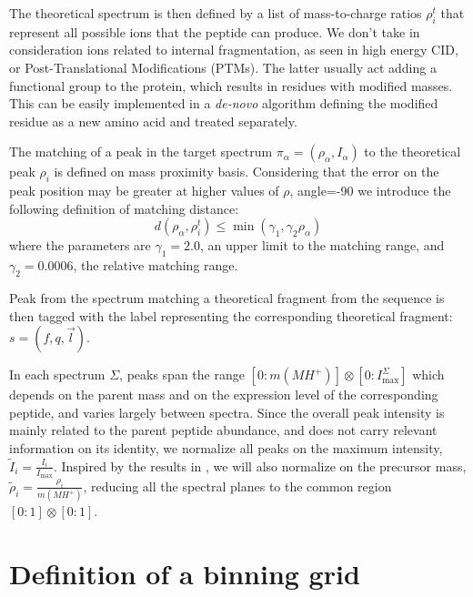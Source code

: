 The theoretical spectrum is then defined by a list of mass-to-charge ratios
$\rho_i^t$ that represent all possible ions that the peptide can produce.
We don't take in consideration ions related to internal fragmentation, as seen in
high energy CID, or Post-Translational Modifications (PTMs). The
latter usually act adding a functional group to the protein, which results in
residues with modified masses. This can be easily implemented in a
\emph{de-novo} algorithm defining the modified residue as a new amino acid and
treated separately.

The matching of a peak in the target spectrum
$\pi_\alpha=(\rho_\alpha,I_\alpha)$ to the theoretical peak $\rho_i$ is
defined on mass proximity basis.
Considering that the error on the peak position may be greater at higher values
of $\rho$, angle=-90
we introduce the following definition of matching distance:
\begin{equation}
d(\rho_\alpha,\rho_i^t)\leq \min(\gamma_1,\gamma_2\rho_\alpha)
\end{equation}
where the parameters are $\gamma_1=2.0$, an upper limit to the matching range,
and $\gamma_2=0.0006$, the relative matching range.

Peak from the spectrum matching a theoretical fragment from the sequence is then
tagged with 
the label representing the corresponding theoretical fragment:
$s=(f,q,\vec l)$.

In each spectrum $\Sigma$, peaks %
span  the range $[0:m(MH^+)]\otimes[0:I^{\Sigma}_\textrm{max}]$ 
which depends on the parent mass and on the
expression level of the corresponding peptide, and varies largely between
spectra. Since the overall peak intensity is mainly related to the parent
peptide abundance, and does not carry relevant information on its identity,
we normalize all peaks on the maximum intensity, $\tilde
I_i=\frac {I_i} {I_\textrm{max}}$. Inspired by the results in
\cite{gygi2004nature}, 
we will also normalize on the precursor mass,
$\tilde\rho_i=\frac{\rho_i}{m(MH^+)}$, reducing all the spectral planes to the
common region 
$[0:1]\otimes[0:1]$.

\section{Definition of a binning grid}


